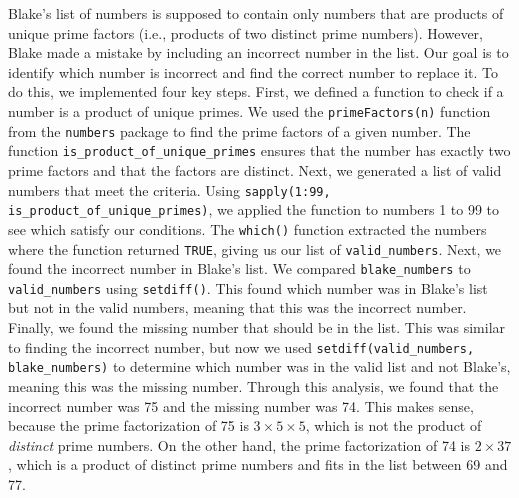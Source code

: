 \documentclass{article}\usepackage[]{graphicx}\usepackage[]{xcolor}
\begin{document}
Blake's list of numbers is supposed to contain only numbers that are products of
unique prime factors (i.e., products of two distinct prime numbers). However, 
Blake made a mistake by including an incorrect number in the list. Our goal is 
to identify which number is incorrect and find the correct number to replace it. 
To do this, we implemented four key steps. First, we defined a function to check
if a number is a product of unique primes. We used the \texttt{primeFactors(n)} 
function from the \texttt{numbers} package \citep{numbers} to find the prime 
factors of a given number. The function \texttt{is\_product\_of\_unique\_primes}
ensures that the number has exactly two prime factors and that the factors are
distinct. Next, we generated a list of valid numbers that meet the criteria. 
Using \texttt{sapply(1:99, is\_product\_of\_unique\_primes)}, we applied the function 
to numbers 1 to 99 to see which satisfy our conditions. The \texttt{which()} 
function extracted the numbers where the function returned \texttt{TRUE}, 
giving us our list of \texttt{valid\_numbers}. Next, we found the incorrect
number in Blake's list. We compared \texttt{blake\_numbers} to 
\texttt{valid\_numbers} using \texttt{setdiff()}. This found which number
was in Blake's list but not in the valid numbers, meaning that this was the
incorrect number. Finally, we found the missing number that should be in the
list. This was similar to finding the incorrect number, but now we used
\texttt{setdiff(valid\_numbers, blake\_numbers)} to determine which number was in
the valid list and not Blake's, meaning this was the missing number. Through 
this analysis, we found that the incorrect number was 75 and the missing number
was 74. This makes sense, because the prime factorization of 75 is 
\(3 \times 5 \times 5\), which is not the product of \textit{distinct} prime 
numbers. On the other hand, the prime factorization of 74 is \(2 \times 37\),
which is a product of distinct prime numbers and fits in the list between 69 
and 77.


\end{document}
